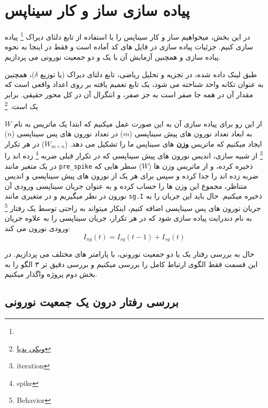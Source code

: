 
\newpage
\section{پیاده سازی ساز و کار سیناپس}
    در این بخش، میخواهیم ساز و کار سیناپس را با استفاده از تابع دلتای دیراک
    \footnote{}
    پیاده سازی کنیم. جزئیات پیاده سازی در فایل های کد آماده است و فقط در اینجا به نحوه پیاده سازی و همچنین آزمایش آن با یک و دو جمعیت نورونی می پردازیم.

    طبق لینک داده شده، در تجزیه و تحلیل ریاضی، تابع دلتای دیراک
    (یا توزیع $\delta$)، 
    همچنین به عنوان تکانه واحد شناخته می شود، یک تابع تعمیم یافته بر روی اعداد واقعی است که مقدار آن در همه جا صفر است به جز صفر، و انتگرال آن در کل محور حقیقی. برابر یک است.
    \footnote{\href{https://en.wikipedia.org/wiki/Dirac\_delta\_function}{ویکی پدیا}}

    از این رو برای پیاده سازی آن به این صورت عمل میکنیم که ابتدا یک ماتریس به نام 
    $W$ 
    به ابعاد تعداد نورون های پیش سیناپسی
    ($m$)
    در تعداد نورون های پس سیناپسی
    ($n$) 
    ایجاد میکنیم که ماتریس 
    \textbf{وزن}
    های سیناپس ما را تشکیل می دهد.
    ($W_{m\times n}$)
    در هر تکرار
    \footnote{iteration}
    از شبیه سازی، اندیس نورون های پیش سیناپسی که در تکرار قبلی ضربه 
    \footnote{spike}
    زده اند را در یک متغیر مانند 
    \texttt{pre\_spike}
    ذخیره کرده، و از ماتریس وزن ها
    ($W$)
    سطر هایی که ضربه زده اند را جدا کرده و سپس برای هر یک از نورون های پیش سیناپسی و اندیس متناظر، مجموع این وزن ها را حساب کرده و به عنوان جریان سیناپسی ورودی آن نورون در نظر میگیریم و در متغیری مانند 
    \texttt{sg.I}
    ذخیره میکنیم. حال باید این جریان را به جریان نورون های پس سیناپسی اضافه کنیم، اینکار میتواند به راحتی توسط یک رفتار
    \footnote{Behavior}
    به نام دندرایت پیاده سازی شود که در هر تکرار، جریان سیناپسی را به علاوه جریان ورودی نورون می کند:
    \begin{equation}
        I_{ng}(t) = I_{sg}(t-1) + I_{sg}(t)
    \end{equation}

    حال به بررسی رفتار یک یا دو جمعیت نورونی، با پارامتر های مختلف می پردازیم. در این قسمت فقط الگوی ارتباط کامل را بررسی میکنیم و بررسی دقیق تر ۳ الگو را به بخش دوم پروژه واگذار میکنیم.
    \subsection{بررسی رفتار درون یک جمعیت نورونی}
